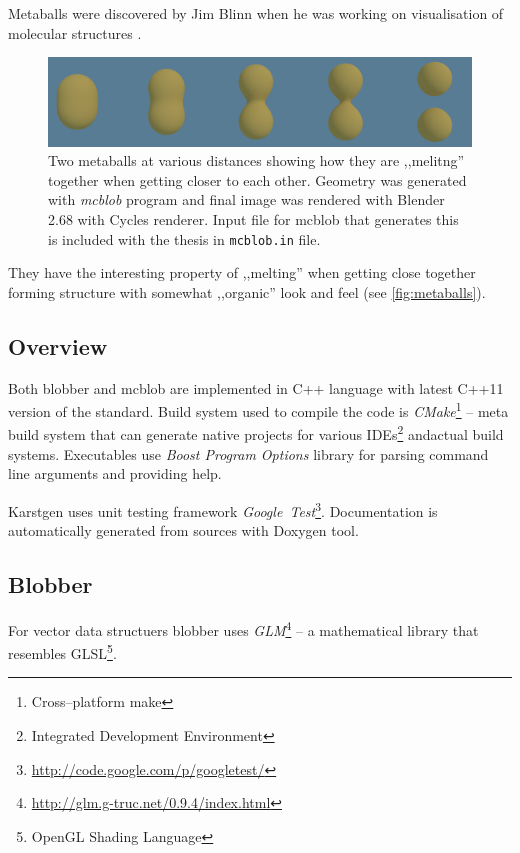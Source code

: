 Metaballs were discovered by Jim Blinn when he was working on visualisation of
molecular structures \parencite{Blinn:1982:GAS:357306.357310}.
\label{sub:metaballs}
\begin{figure}[htb]
  \begin{center}
    \includegraphics[width=\textwidth]{chapters/project/metaballs.png}
  \end{center}
  \caption{Two metaballs at various distances showing how they are ,,melitng''
    together when getting closer to each other. Geometry was generated with
    \emph{mcblob} program and final image was rendered with Blender 2.68 with
    Cycles renderer. Input file for mcblob that generates this is included with the thesis
      in \texttt{mcblob.in} file.
  }
  \label{fig:metaballs}
\end{figure}

They have the interesting property of ,,melting'' when getting close together
forming structure with somewhat ,,organic'' look and feel (see \autoref{fig:metaballs}).

\subsection{Overview}
Both blobber and mcblob are implemented in C++ language with latest C++11
version of the standard. Build system used to compile the code is \emph{CMake}\footnote{Cross--platform make}
-- meta build system that can generate native projects for various IDEs\footnote{Integrated Development Environment}
andactual build systems. Executables use \emph{Boost Program Options} library
for parsing command line arguments and providing help.

Karstgen uses unit testing framework \emph{Google~Test}\footnote{\url{http://code.google.com/p/googletest/}}.
Documentation is automatically generated from sources with Doxygen
tool.


\subsection{Blobber}

For vector data structuers blobber uses \emph{GLM}\footnote{\url{http://glm.g-truc.net/0.9.4/index.html}}
-- a mathematical library that resembles GLSL\footnote{OpenGL Shading Language}.


